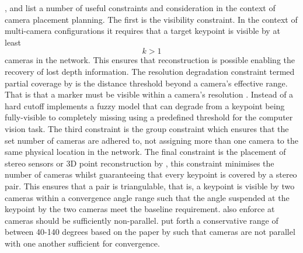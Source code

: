 \cite{zhao2013approximate}, \cite{rahimian2016optimal} and \citet{aissaoui2018designing} list a number of useful constraints and consideration in the context of camera placement planning. The first is the visibility constraint. In the context of multi-camera configurations it requires that a target keypoint is visible by at least $$k > 1 $$ cameras in the network. This ensures that reconstruction is possible enabling the recovery of lost depth information.
The resolution degradation constraint termed partial coverage by \cite{zhao2013approximate} is the distance threshold beyond a camera's effective range. That is that a marker must be visible within a camera's resolution \cite{aissaoui2018designing}. Instead of a hard cutoff \citet{zhao2013approximate} implements a fuzzy model that can degrade from a keypoint being fully-visible to completely missing using a predefined threshold for the computer vision task.
The third constraint is the group constraint which ensures that the set number of cameras are adhered to, not assigning more than one camera to the same physical location in the network.
The final constraint is the placement of stereo sensors or 3D point reconstruction by \citet{rahimian2016optimal}, this constraint minimises the number of cameras whilst guaranteeing that every keypoint is covered by a stereo pair. This ensures that a pair is triangulable, that is, a keypoint is visible by two cameras within a convergence angle range such that the angle suspended at the keypoint by the two cameras meet the baseline requirement. \citet{aissaoui2018designing} also enforce at cameras should be sufficiently non-parallel. \cite{rahimian2016optimal} put forth a conservative range of between 40-140 degrees based on the paper by \cite{olague2002optimal} such that cameras are not parallel with one another sufficient for convergence.

